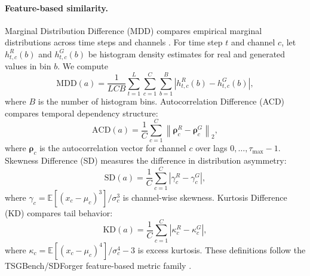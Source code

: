 \paragraph{Feature-based similarity.}
Marginal Distribution Difference (MDD) compares empirical marginal
distributions across time steps and channels \cite{ang2023tsgbench}. For time
step $t$ and channel $c$, let $h_{t,c}^{R}(b)$ and $h_{t,c}^{G}(b)$ be
histogram density estimates for real and generated values in bin $b$. We compute
\begin{equation}
    \mathrm{MDD}(a)
    =
    \frac{1}{LCB}
    \sum_{t=1}^{L}\sum_{c=1}^{C}\sum_{b=1}^{B}
    \left|
    h_{t,c}^{R}(b)-h_{t,c}^{G}(b)
    \right| ,
\end{equation}
where $B$ is the number of histogram bins. Autocorrelation Difference (ACD)
compares temporal dependency structure:
\begin{equation}
    \mathrm{ACD}(a)
    =
    \frac{1}{C}
    \sum_{c=1}^{C}
    \left\|
    \boldsymbol{\rho}_{c}^{R}
    -
    \boldsymbol{\rho}_{c}^{G}
    \right\|_2 ,
\end{equation}
where $\boldsymbol{\rho}_{c}$ is the autocorrelation vector for channel $c$ over
lags $0,\ldots,\tau_{\max}-1$. Skewness Difference (SD) measures the difference
in distribution asymmetry:
\begin{equation}
    \mathrm{SD}(a)
    =
    \frac{1}{C}
    \sum_{c=1}^{C}
    \left|
    \gamma_c^{R}-\gamma_c^{G}
    \right| ,
\end{equation}
where $\gamma_c=\mathbb{E}[(x_c-\mu_c)^3]/\sigma_c^3$ is channel-wise skewness.
Kurtosis Difference (KD) compares tail behavior:
\begin{equation}
    \mathrm{KD}(a)
    =
    \frac{1}{C}
    \sum_{c=1}^{C}
    \left|
    \kappa_c^{R}-\kappa_c^{G}
    \right| ,
\end{equation}
where $\kappa_c=\mathbb{E}[(x_c-\mu_c)^4]/\sigma_c^4-3$ is excess kurtosis.
These definitions follow the TSGBench/SDForger feature-based metric family
\cite{ang2023tsgbench,rousseau2025sdforger}.

